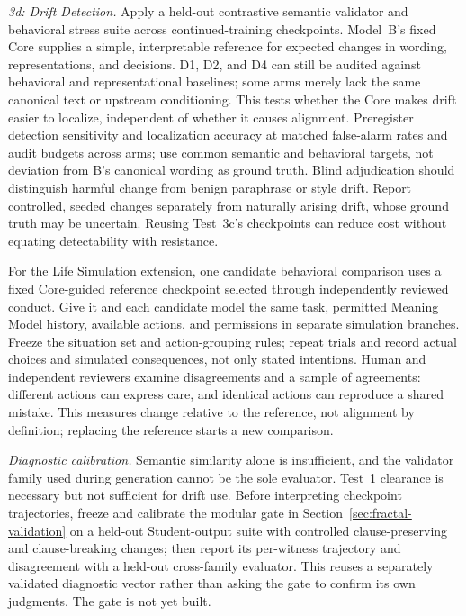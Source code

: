 \documentclass[11pt]{article}
\begin{document}
\emph{3d: Drift Detection.} Apply a held-out contrastive semantic validator and
behavioral stress suite across continued-training checkpoints. Model~B's fixed
Core supplies a simple, interpretable reference for expected changes in wording,
representations, and decisions. D1, D2, and D4 can still be audited against behavioral
and representational baselines; some arms merely lack the same canonical text
or upstream conditioning. This
tests whether the Core makes drift easier to localize, independent of whether it
causes alignment. Preregister detection sensitivity and localization accuracy
at matched false-alarm rates and audit budgets across arms; use common
semantic and behavioral targets, not deviation from B's canonical wording as
ground truth. Blind adjudication should distinguish harmful change from benign
paraphrase or style drift. Report controlled, seeded changes separately from
naturally arising drift, whose ground truth may be uncertain. Reusing Test~3c's
checkpoints can reduce cost without equating detectability with resistance.

For the Life Simulation extension, one candidate behavioral comparison uses a
fixed Core-guided reference checkpoint selected through independently reviewed
conduct. Give it and each candidate model the same task, permitted Meaning
Model history, available actions, and permissions in separate simulation
branches. Freeze the situation set and action-grouping rules; repeat trials
and record actual choices and simulated consequences, not only stated
intentions. Human and independent reviewers examine disagreements and a sample of
agreements: different actions can express care, and identical actions can
reproduce a shared mistake. This measures change relative to the reference,
not alignment by definition; replacing the reference starts a new comparison.

\emph{Diagnostic calibration.} Semantic similarity alone is insufficient, and the validator
family used during generation cannot be the sole evaluator. Test~1 clearance is
necessary but not sufficient for drift use. Before interpreting checkpoint
trajectories, freeze and calibrate the modular gate in
Section~\ref{sec:fractal-validation} on a held-out Student-output suite with
controlled clause-preserving and clause-breaking changes; then report its
per-witness trajectory and disagreement with a held-out cross-family evaluator.
This reuses a separately validated diagnostic vector rather than asking the gate
to confirm its own judgments. The gate is not yet built.
\end{document}
